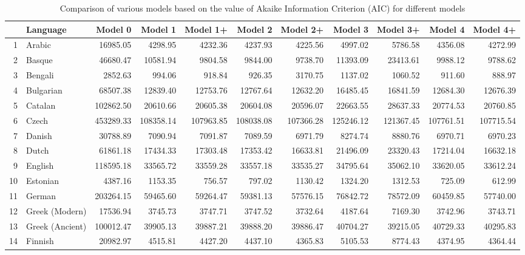 \documentclass[a4paper]{article}
\begin{document}
\pagestyle{empty}
\begin{table}
\caption{Comparison of various models based on the value of Akaike Information Criterion (AIC) for different models}\label{table:NSFAccuDivBG}%
\centering
\begin{tabular}{rlrrrrrrrrr}
  \hline
 & Language & Model 0 & Model 1 & Model 1+ & Model 2 & Model 2+ & Model 3 & Model 3+ & Model 4 & Model 4+ \\ 
  \hline
1 & Arabic & 16985.05 & 4298.95 & 4232.36 & 4237.93 & 4225.56 & 4997.02 & 5786.58 & 4356.08 & 4272.99 \\ 
  2 & Basque & 46680.47 & 10581.94 & 9804.58 & 9844.00 & 9738.70 & 11393.09 & 23413.61 & 9988.12 & 9788.62 \\ 
  3 & Bengali & 2852.63 & 994.06 & 918.84 & 926.35 & 3170.75 & 1137.02 & 1060.52 & 911.60 & 888.97 \\ 
  4 & Bulgarian & 68507.38 & 12839.40 & 12753.76 & 12767.64 & 12632.20 & 16485.45 & 16841.59 & 12684.30 & 12676.39 \\ 
  5 & Catalan & 102862.50 & 20610.66 & 20605.38 & 20604.08 & 20596.07 & 22663.55 & 28637.33 & 20774.53 & 20760.85 \\ 
  6 & Czech & 453289.33 & 108358.14 & 107963.85 & 108038.08 & 107366.28 & 125246.12 & 121367.45 & 107761.51 & 107715.54 \\ 
  7 & Danish & 30788.89 & 7090.94 & 7091.87 & 7089.59 & 6971.79 & 8274.74 & 8880.76 & 6970.71 & 6970.23 \\ 
  8 & Dutch & 61861.18 & 17434.33 & 17303.48 & 17353.42 & 16633.81 & 21496.09 & 23320.43 & 17214.04 & 16632.18 \\ 
  9 & English & 118595.18 & 33565.72 & 33559.28 & 33557.18 & 33535.27 & 34795.64 & 35062.10 & 33620.05 & 33612.24 \\ 
  10 & Estonian & 4387.16 & 1153.35 & 756.57 & 797.02 & 1130.42 & 1324.20 & 1312.53 & 725.09 & 612.99 \\ 
  11 & German & 203264.15 & 59465.60 & 59264.47 & 59381.13 & 57576.15 & 76842.72 & 78572.09 & 60459.85 & 57740.00 \\ 
  12 & Greek (Modern) & 17536.94 & 3745.73 & 3747.71 & 3747.52 & 3732.64 & 4187.64 & 7169.30 & 3742.96 & 3743.71 \\ 
  13 & Greek (Ancient) & 100012.47 & 39905.13 & 39887.21 & 39888.20 & 39886.47 & 40704.27 & 39215.05 & 40729.33 & 40295.83 \\ 
  14 & Finnish & 20982.97 & 4515.81 & 4427.20 & 4437.10 & 4365.83 & 5105.53 & 8774.43 & 4374.95 & 4364.44 \\ 

\end{tabular}
\end{table}
\end{document}
